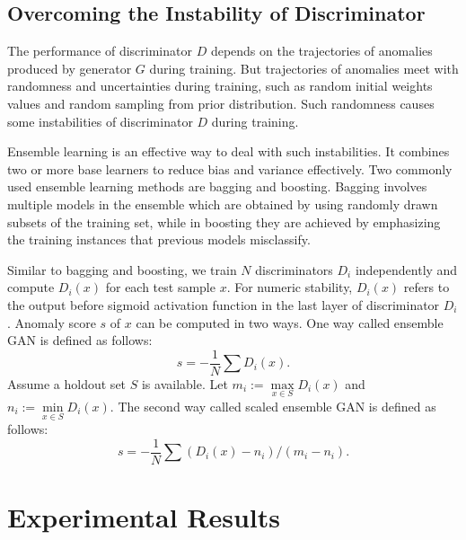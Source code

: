 \documentclass[a4paper,conference]{IEEEtran}
\begin{document}
\subsection{Overcoming the Instability of Discriminator}
%





The performance of discriminator $D$ depends on the trajectories of anomalies produced by generator $G$ during training. But trajectories of anomalies meet with randomness and uncertainties during training, such as random initial weights values and random sampling from prior distribution. Such randomness causes some instabilities of discriminator $D$ during training.

Ensemble learning is an effective way to deal with such instabilities. It combines two or more base learners to reduce bias and variance effectively. Two commonly used ensemble learning methods are bagging and boosting. Bagging involves multiple models in the ensemble which are obtained by using randomly drawn subsets of the training set, while in boosting they are achieved by emphasizing the training instances that previous models misclassify.


Similar to bagging and boosting, we train $N$ discriminators $D_i$ independently and compute $D_i(x)$ for each test sample $x$. For numeric stability, $D_i(x)$ refers to the output before sigmoid activation function in the last layer of discriminator $D_i$.  Anomaly score  $s$ of $x$ can be computed in two  ways. One way called ensemble GAN is defined as follows: \[s = -\frac{1}{N}\sum D_i(x).\]  Assume a holdout set $S$ is available.  Let $m_i:=\max\limits_{x\in S} D_i(x)$ and $n_i:=\min\limits_{x\in S} D_i(x)$. The second  way called scaled ensemble GAN is defined as follows:
\[s = -\frac{1}{N}\sum(D_i(x)-n_i) / (m_i-n_i).\]

\section{Experimental Results}
\end{document}
